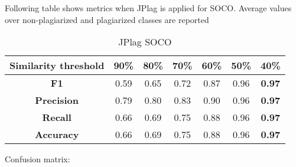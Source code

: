 \begin{table}[ht]
\centering
\caption{Confusion matrix for best performing model (6-g)}
\label{tbl-sd-soco-conf}
\end{table}



Following table shows metrics when JPlag is applied for SOCO. Average values over non-plagiarized and plagiarized classes are reported

\begin{table}[ht]
\centering
\caption{JPlag SOCO}
\label{tbl-jplag-soco}
\begin{tabular}{|c||c|c|c|c|c|c|} \hline
\bf Similarity threshold & 90\% & 80\% & 70\% & 60\% & 50\% & 40\% \\ \hline
\bf F1                  & 0.59   &  0.65   &  0.72   &  0.87   &  0.96   & \bf 0.97    \\ \hline
\bf Precision           & 0.79    &  0.80   &  0.83   &  0.90   & 0.96    &  \bf 0.97   \\ \hline
\bf Recall              &  0.66   &  0.69    &  0.75   & 0.88    &  0.96   & \bf 0.97     \\ \hline
\bf Accuracy            &  0.66   &  0.69   & 0.75    &  0.88   &  0.96   & \bf 0.97   \\ \hline
\end{tabular}
\end{table}

\newpage


Confusion matrix:

\begin{table}[ht]
\centering
\caption{Confusion matrix for the best performing JPlag (sim 40\%)}
\label{tbl-jplag-soco-conf}
\end{table}


